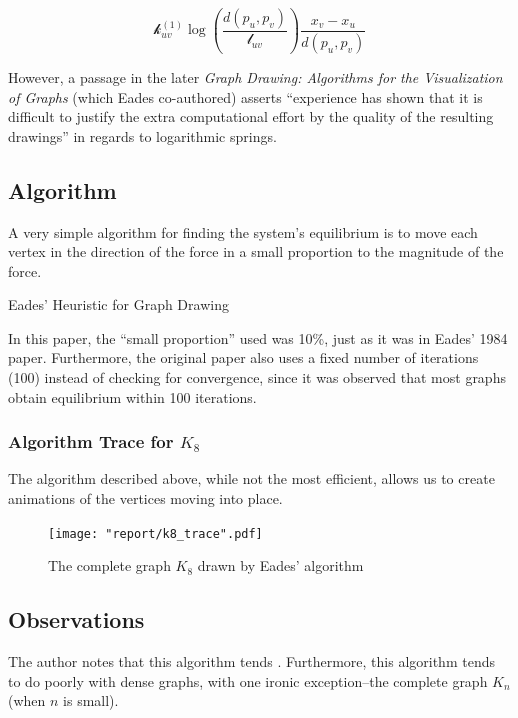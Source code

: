 \documentclass[11pt]{report}
\begin{document}
\[
    \mathcal{k}_{uv}^{(1)} \log{\left(
        \frac{d(p_u, p_v)}{\mathcal{l}_{uv}}
        \right)}
    \frac{x_v - x_u}{d(p_u, p_v)}
\]

However, a passage in the later \textit{Graph Drawing: Algorithms for the Visualization of Graphs} (which Eades co-authored) asserts ``experience has shown that it is difficult to justify the extra computational effort by the quality of the resulting drawings'' in regards to logarithmic springs.

\subsection{Algorithm}
A very simple algorithm for finding the system's equilibrium is to move each vertex in the direction of the force in a small proportion to the magnitude of the force.

\begin{algorithm}[H]
    \caption{Eades' Heuristic for Graph Drawing}
    \begin{algorithmic}[1]
        \EndFor
        \EndWhile
        \EndProcedure
    \end{algorithmic}
\end{algorithm}

In this paper, the ``small proportion'' used was 10\%, just as it was in Eades' 1984 paper. Furthermore, the original paper also uses a fixed number of iterations (100) instead of checking for convergence, since it was observed that most graphs obtain equilibrium within 100 iterations.

\subsubsection{Algorithm Trace for $K_8$}
The algorithm described above, while not the most efficient, allows us to create animations of the vertices moving into place.

\begin{figure}[H]
    \centering
    \texttt{[image: "report/k8\_trace".pdf]}
    \caption{The complete graph $K_8$ drawn by Eades' algorithm}
\end{figure}

\subsection{Observations}
The author notes that this algorithm tends . Furthermore, this algorithm tends to do poorly with dense graphs, with one ironic exception--the complete graph $K_n$ (when $n$ is small).
\end{document}

